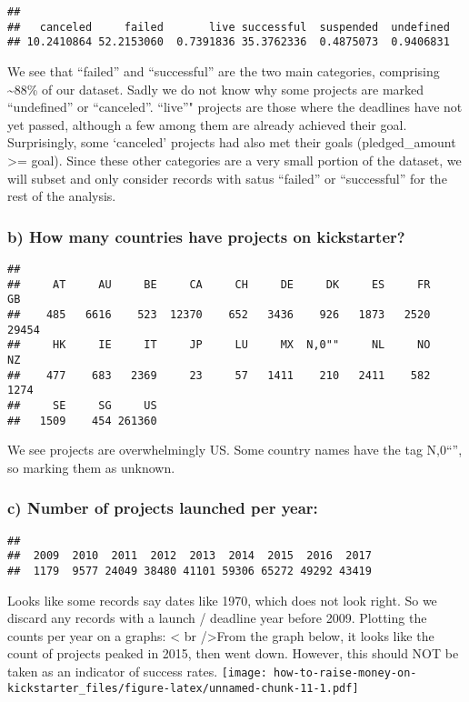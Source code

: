 \documentclass[]{article}
\begin{document}
\begin{verbatim}
## 
##   canceled     failed       live successful  suspended  undefined 
## 10.2410864 52.2153060  0.7391836 35.3762336  0.4875073  0.9406831
\end{verbatim}

We see that ``failed'' and ``successful'' are the two main categories,
comprising \textasciitilde{}88\% of our dataset. Sadly we do not know
why some projects are marked ``undefined'' or ``canceled''. ``live''"
projects are those where the deadlines have not yet passed, although a
few among them are already achieved their goal. Surprisingly, some
`canceled' projects had also met their goals (pledged\_amount
\textgreater{}= goal). Since these other categories are a very small
portion of the dataset, we will subset and only consider records with
satus ``failed'' or ``successful'' for the rest of the analysis.

\subsubsection{b) How many countries have projects on
kickstarter?}\label{b-how-many-countries-have-projects-on-kickstarter}

\begin{verbatim}
## 
##     AT     AU     BE     CA     CH     DE     DK     ES     FR     GB 
##    485   6616    523  12370    652   3436    926   1873   2520  29454 
##     HK     IE     IT     JP     LU     MX  N,0""     NL     NO     NZ 
##    477    683   2369     23     57   1411    210   2411    582   1274 
##     SE     SG     US 
##   1509    454 261360
\end{verbatim}

We see projects are overwhelmingly US. Some country names have the tag
N,0``'', so marking them as unknown.

\subsubsection{c) Number of projects launched per
year:}\label{c-number-of-projects-launched-per-year}

\begin{verbatim}
## 
##  2009  2010  2011  2012  2013  2014  2015  2016  2017 
##  1179  9577 24049 38480 41101 59306 65272 49292 43419
\end{verbatim}

Looks like some records say dates like 1970, which does not look right.
So we discard any records with a launch / deadline year before 2009.
Plotting the counts per year on a graphs: \textless{} br
/\textgreater{}From the graph below, it looks like the count of projects
peaked in 2015, then went down. However, this should NOT be taken as an
indicator of success rates.
\texttt{[image: how-to-raise-money-on-kickstarter\_files/figure-latex/unnamed-chunk-11-1.pdf]}
\end{document}

